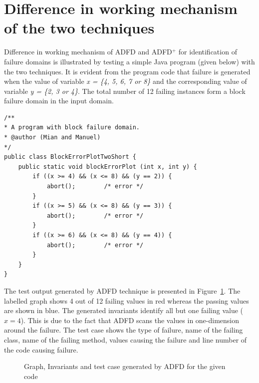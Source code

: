 \documentclass[runningheads,a4paper]{llncs}
\begin{document}

\section{Difference in working mechanism of the two techniques}
Difference in working mechanism of ADFD and ADFD$^+$ for identification of failure domains is illustrated by testing a simple Java program (given below) with the two techniques. It is evident from the program code that failure is generated when the value of variable \textit{x = \{4, 5, 6, 7 or 8\}} and the corresponding value of variable \textit{y = \{2, 3 or 4\}}. The total number of 12 failing instances form a block failure domain in the input domain.

\begin{lstlisting}
/** 
* A program with block failure domain.
* @author (Mian and Manuel)
*/
public class BlockErrorPlotTwoShort {
	public static void blockErrorPlot (int x, int y) {
		if ((x >= 4) && (x <= 8) && (y == 2)) { 
			abort();		/* error */
		}
		if ((x >= 5) && (x <= 8) && (y == 3)) { 
			abort();		/* error */
		}
		if ((x >= 6) && (x <= 8) && (y == 4)) { 
			abort();		/* error */
		}
	}
}
\end{lstlisting}

The test output generated by ADFD technique is presented in Figure~\ref{fig:ADFD}. The labelled graph shows 4 out of 12 failing values in red whereas the passing values are shown in blue. The generated invariants identify all but one failing value ($x = 4$). This is due to the fact that ADFD scans the values in one-dimension around the failure. The test case shows the type of failure, name of the failing class, name of the failing method, values causing the failure and line number of the code causing failure.

\begin{figure}[h]
\caption{Graph, Invariants and test case generated by ADFD for the given code}
\label{fig:ADFD}
\end{figure}
\end{document}
